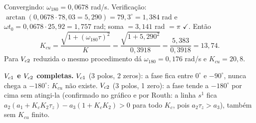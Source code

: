 Convergindo: $\omega_{180}=0{,}0678$ rad/s. Verificação: $\arctan(0{,}0678\cdot78{,}03=5{,}290)=79{,}3^\circ=1{,}384$ rad e $\omega t_0=0{,}0678\cdot25{,}92=1{,}757$ rad; soma $=3{,}141$ rad $=\pi$ $\checkmark$. Então
\[
K_{cu}=\frac{\sqrt{1+(\omega_{180}\tau)^2}}{K}=\frac{\sqrt{1+5{,}290^2}}{0{,}3918}=\frac{5{,}383}{0{,}3918}=13{,}74 .
\]
Para $V_{c2}$ reduzida o mesmo procedimento dá $\omega_{180}=0{,}176$ rad/s e $K_{cu}=20{,}8$.

\textbf{$V_{c1}$ e $V_{c2}$ completas.} $V_{c1}$ (3 polos, 2 zeros): a fase fica entre $0^\circ$ e $-90^\circ$, nunca chega a $-180^\circ$: $K_{cu}$ não existe. $V_{c2}$ (3 polos, 1 zero): a fase tende a $-180^\circ$ por cima sem atingi-la (confirmado no gráfico e por Routh: a linha $s^1$ fica $a_2(a_1+K_cK_2\tau_z)-a_3(1+K_cK_2)>0$ para todo $K_c$, pois $a_2\tau_z>a_3$), também sem $K_{cu}$ finito.


